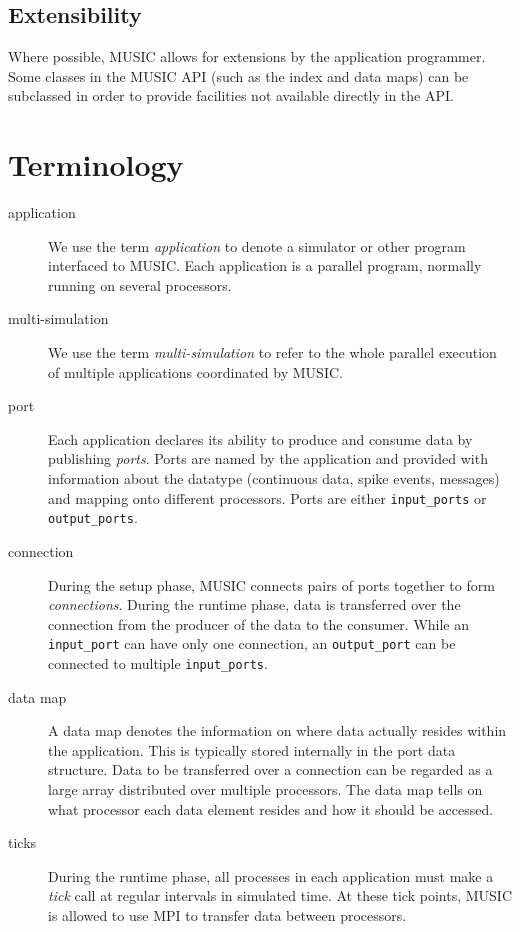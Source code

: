 \documentclass[a4paper]{report}
\begin{document}
\subsection{Extensibility}

Where possible, MUSIC allows for extensions by the application
programmer.  Some classes in the MUSIC API (such as the index and data
maps) can be subclassed in order to provide facilities not available
directly in the API.


\section{Terminology}

\begin{description}
\item[application] We use the term
  \emph{application} to denote a simulator or other
  program interfaced to MUSIC.  Each application is a parallel
  program, normally running on several processors.

\item[multi-simulation] We use the term
  \emph{multi-simulation} to refer to the
  whole parallel execution of multiple applications coordinated by
  MUSIC.

\item[port] Each application declares its ability to produce and
  consume data by publishing \emph{ports}.  Ports are
  named by the application and provided with information about the
  datatype (continuous data, spike events, messages) and mapping onto
  different processors.  Ports are either
  \lstinline|input_ports| or
  \lstinline|output_ports|.

\item[connection] During the setup phase, MUSIC connects pairs of
  ports together to form \emph{connections}.  During
  the runtime phase, data is transferred over the connection from the
  producer of the data to the consumer.  While an
  \lstinline|input_port| can have only one connection, an
  \lstinline|output_port| can be connected to multiple
  \lstinline|input_ports|.

\item[data map] A data map denotes the information on
  where data actually resides within the application.  This is
  typically stored internally in the port data structure.  Data to be
  transferred over a connection can be regarded as a large array
  distributed over multiple processors. The data map tells on
  what processor each data element resides and how it should be
  accessed.

\item[ticks] During the runtime phase, all processes in each
  application must make a \emph{tick} call at regular
  intervals in simulated time.  At these tick points, MUSIC is allowed
  to use MPI to transfer data between processors.
\end{description}
\end{document}
